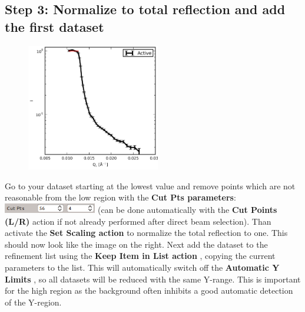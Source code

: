   \subsection{Step 3: Normalize to total reflection and add the first dataset}
    \begin{figure}
     \includegraphics[width=165pt]{screenshots/totalreflection.png} 
    \end{figure}
    Go to your dataset starting at the lowest \Qz value and remove points which are not reasonable from the low \Qz region with the \textbf{Cut Pts parameters}:
    \includegraphics[width=115pt]{screenshots/cutpoints.png} (can be done automatically with the \textbf{Cut Points (L/R)}  action if not already performed after direct beam selection). Than activate the \textbf{Set Scaling action}  to normalize the total reflection to one.
    This should now look like the image on the right.
    Next add the dataset to the refinement list using the \textbf{Keep Item in List action} , copying the current parameters to the list.
    This will automatically switch off the \textbf{Automatic Y Limits} , so all datasets will be reduced with the same Y-range.
    This is important for the high \Qz region as the background often inhibits a good automatic detection of the Y-region.
    
  
